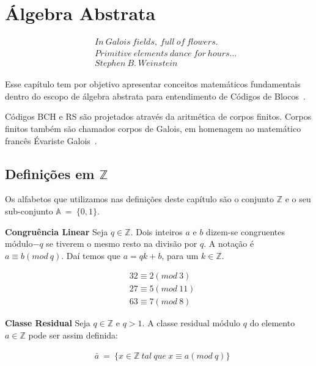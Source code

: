 \chapter{Álgebra Abstrata}



{\small
\begin{align*}
&& In\ Galois\ fields,\ full\ of\ flowers.\\
&& Primitive\ elements\ dance\ for\ hours \ldots\\
&& Stephen\ B.\ Weinstein
\end{align*}
}


Esse capítulo tem por objetivo apresentar conceitos matemáticos fundamentais
dentro do escopo de álgebra abstrata para entendimento de Códigos de Blocos~\cite{Hefez:2008}.

Códigos BCH e RS são projetados através da aritmética de corpos finitos. Corpos finitos
também são chamados corpos de Galois, em homenagem ao matemático francês Évariste Galois~\cite{Connell:2004}.

\section{Definições em $\mathbb{Z}$}

Os alfabetos que utilizamos nas definições deste capítulo são o conjunto $\mathbb{Z}$ e o seu sub-conjunto $\mathbb{A}\ =\ \{ 0, 1\}$.

\begin{definition} {\bf Congruência Linear}  Seja $q \in \mathbb{Z}$. Dois inteiros $a$
 e $b$ dizem-se congruentes módulo$-q$ se tiverem o mesmo resto na divisão por
 $q$. A notação é $a \equiv b(mod\ q)$. Daí temos que $a = qk + b$, para um $k \in \mathbb{Z}$.
\end{definition}

\begin{example}
\begin{align*}
& 32 \equiv 2(mod\ 3)\\
& 27 \equiv 5(mod\ 11)\\
& 63 \equiv 7(mod\ 8)
\end{align*}
\end{example}


\begin{definition} {\bf Classe Residual}  Seja $q \in \mathbb{Z}$ e $q > 1$. A classe
residual módulo $q$ do elemento $a \in \mathbb{Z}$ pode ser assim definida:

\begin{align*}
& \bar{a}\ =\ \{ x \in \mathbb{Z}\ tal\ que\ x \equiv a(mod\ q)\}
\end{align*}

\end{definition}

